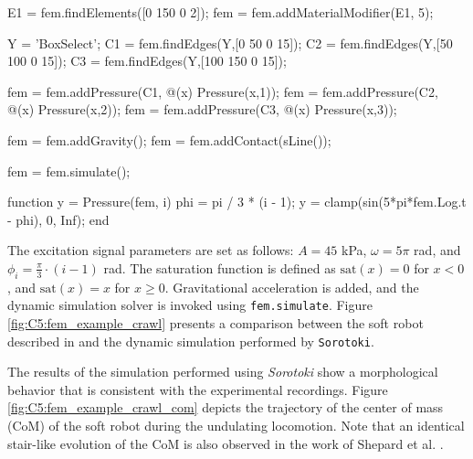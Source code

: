 \begin{example}
\begin{matlabcode}
E1  = fem.findElements([0 150 0 2]);
fem = fem.addMaterialModifier(E1, 5);

Y  = 'BoxSelect';
C1 = fem.findEdges(Y,[0   50 0 15]);
C2 = fem.findEdges(Y,[50  100 0 15]);
C3 = fem.findEdges(Y,[100 150 0 15]);

fem = fem.addPressure(C1, @(x) Pressure(x,1));
fem = fem.addPressure(C2, @(x) Pressure(x,2));
fem = fem.addPressure(C3, @(x) Pressure(x,3));

fem = fem.addGravity();
fem = fem.addContact(sLine());

fem = fem.simulate();

function y = Pressure(fem, i)
    phi = pi / 3 * (i - 1);
    y = clamp(sin(5*pi*fem.Log.t - phi), 0, Inf);
end
\end{matlabcode}
\vfill
The excitation signal parameters are set as follows: $A = 45$ \si{\kilo \pascal}, $\omega = 5 \pi$ \si{\radian}, and $\phi_i = \frac{\pi}{3} \cdot (i-1)$ \si{\radian}. The saturation function is defined as $\textrm{sat}(x) = 0$ for $x < 0$, and $\textrm{sat}(x) = x$ for $x \geq 0$. Gravitational acceleration is added, and the dynamic simulation solver is invoked using \texttt{fem.simulate}. Figure \ref{fig:C5:fem_example_crawl} presents a comparison between the soft robot described in \cite{Shepherd2011Dec} and the dynamic simulation performed by \texttt{Sorotoki}.

The results of the simulation performed using \textit{Sorotoki} show a morphological behavior that is consistent with the experimental recordings. Figure \ref{fig:C5:fem_example_crawl_com} depicts the trajectory of the center of mass (CoM) of the soft robot during the undulating locomotion. Note that an identical stair-like evolution of the CoM is also observed in the work of Shepard et al. \cite{Shepherd2011Dec}. 
\vfill
\end{example}

%

